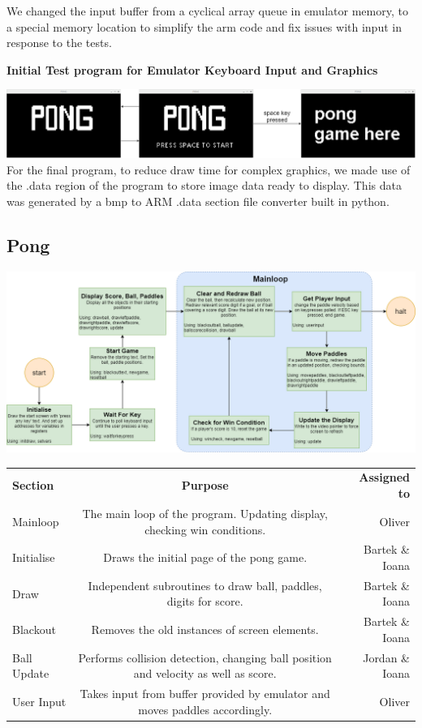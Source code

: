 \documentclass[11pt]{article}
\begin{document}
We changed the input buffer from a cyclical array queue in emulator memory, to a special memory location to simplify the arm code and fix issues with input in response to the tests.
\centerline{\textbf{Initial Test program for Emulator Keyboard Input and Graphics}}
\includegraphics[width = \textwidth]{emulator testing PONG program}
For the final program, to reduce draw time for complex graphics, we made use of the .data region of the program to store image data ready to display. This data was generated by a bmp to ARM .data section file converter built in python.
\subsection*{Pong}
\begin{center}
	\includegraphics[width = \textwidth]{pong game structure}\\
\end{center}
\begin{center}
	\begin{tabular}{l|c|r}
		\textbf{Section} & \textbf{Purpose} & \textbf{Assigned to}\\
		Mainloop & The main loop of the program. Updating display, checking win conditions. & Oliver\\
		Initialise & Draws the initial page of the pong game. & Bartek \& Ioana\\
		Draw & Independent subroutines to draw ball, paddles, digits for score. & Bartek \& Ioana\\
		Blackout & Removes the old instances of screen elements. & Bartek \& Ioana\\
		Ball Update & Performs collision detection, changing ball position and velocity as well as score. & Jordan \& Ioana\\
		User Input & Takes input from buffer provided by emulator and moves paddles accordingly. & Oliver \\
	\end{tabular}
\end{center}
\end{document}

